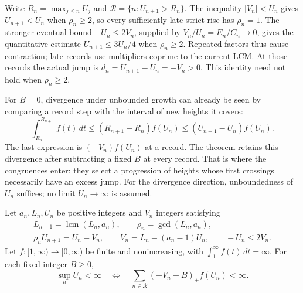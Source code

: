 \documentclass[11pt]{article}
\begin{document}
Write $R_n=\max_{j\le n}U_j$ and
$\mathcal R=\{n:U_{n+1}>R_n\}$.  The inequality $|V_n|<U_n$ gives
$U_{n+1}<U_n$ when $\rho_n\ge2$, so every sufficiently late strict rise has
$\rho_n=1$.  The stronger eventual bound $-U_n\le2V_n$, supplied by
$V_n/U_n=E_n/C_n\to0$, gives the quantitative estimate
$U_{n+1}\le3U_n/4$ when $\rho_n\ge2$.
Repeated factors thus cause contraction; late records use multipliers
coprime to the current LCM. At those records the actual jump is
$d_n=U_{n+1}-U_n=-V_n>0$. This identity need not hold when $\rho_n\ge2$.

For $B=0$, divergence under unbounded growth can already be seen by
comparing a record step with the interval of new heights it covers:
\[
 \int_{R_n}^{R_{n+1}}f(t)\,dt
 \le (R_{n+1}-R_n)f(U_n)
 \le (U_{n+1}-U_n)f(U_n).
\]
The last expression is $(-V_n)f(U_n)$ at a record. The theorem retains
this divergence after subtracting a fixed $B$ at every record. That is
where the congruences enter: they select a progression of heights whose
first crossings necessarily have an excess jump. For the divergence direction, unboundedness of $U_n$ suffices; no
limit $U_n\to\infty$ is assumed.

\begin{theorem}\label{long243:res:arithmeticrecord}
Let $a_n,L_n,U_n$ be positive integers and $V_n$ integers satisfying
\[
 \begin{gathered}
 L_{n+1}=\operatorname{lcm}(L_n,a_n),\qquad \rho_n=\gcd(L_n,a_n),\\
 \rho_nU_{n+1}=U_n-V_n,\qquad
 V_n=L_n-(a_n-1)U_n,\qquad -U_n\le2V_n.
 \end{gathered}
\]
Let $f:[1,\infty)\to[0,\infty)$ be finite and nonincreasing, with
$\int_1^\infty f(t)\,dt=\infty$. For each fixed integer $B\ge0$,
\[
 \sup_n U_n<\infty
 \quad\Longleftrightarrow\quad
 \sum_{n\in\mathcal R}(-V_n-B)_+f(U_n)<\infty.
\]
\end{theorem}
\end{document}
